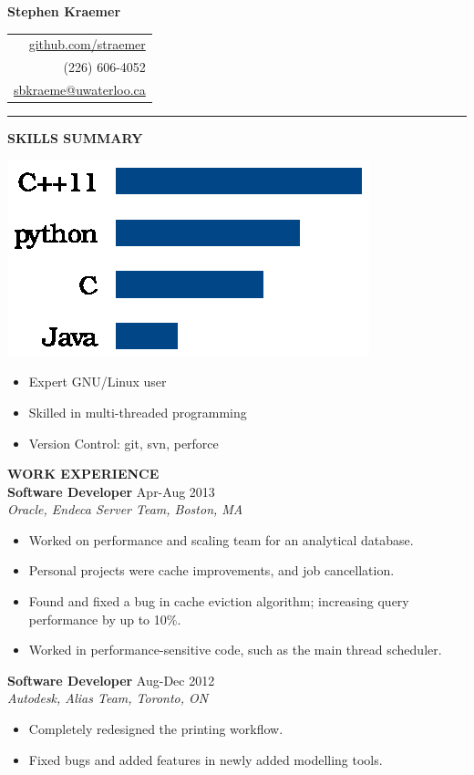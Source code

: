 \documentclass{letter}
\begin{document}
{\Huge\bf Stephen Kraemer} \hfill
\begin{tabular}{r}
\href{https://github.com/straemer}{github.com/straemer} \\
\hfill (226) 606-4052 \\
\hfill \href{mailto:sbkraeme@uwaterloo.ca}{sbkraeme@uwaterloo.ca}
\end{tabular}
\vskip 2pt
\hrule

{\large\bf SKILLS SUMMARY} \\
\begin{minipage}{0.35\textwidth}
\includegraphics{programming_languages.eps}
\end{minipage}
\begin{minipage}{0.65\textwidth}
\begin{itemize}
\item Expert GNU/Linux user
\item Skilled in multi-threaded programming
\item Version Control: git, svn, perforce
\end{itemize}
\end{minipage}


{\large\bf WORK EXPERIENCE} \\
{\bf Software Developer} \hfill Apr-Aug 2013 \\
{\sl Oracle, Endeca Server Team, Boston, MA}
\begin{itemize}
\item Worked on performance and scaling team for an analytical database.
\item Personal projects were cache improvements, and job cancellation.
\item Found and fixed a bug in cache eviction algorithm; increasing query performance by up to 10\%.
\item Worked in performance-sensitive code, such as the main thread scheduler.
\end{itemize}

{\bf Software Developer} \hfill Aug-Dec 2012 \\
{\sl Autodesk, Alias Team, Toronto, ON}
\begin{itemize}
\item Completely redesigned the printing workflow.
\item Fixed bugs and added features in newly added modelling tools.
\end{itemize}
\end{document}
